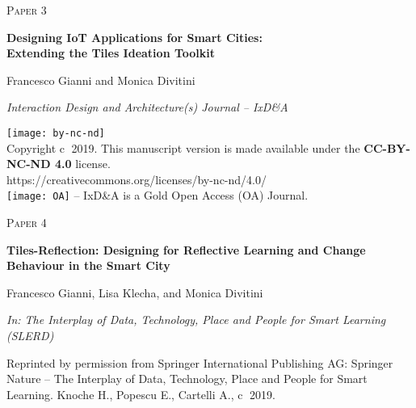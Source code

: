 \cleardoublepage
\begin{flushright}
\textsc{\huge Paper 3}
\end{flushright}
\vspace{3cm}
\begin{center}
	\begin{framed}
		{\Large \textbf{Designing IoT Applications for Smart Cities:\\ Extending the Tiles Ideation Toolkit}}
		
		\medskip
		Francesco Gianni and Monica Divitini
		
		\medskip
		\emph{Interaction Design and Architecture(s) Journal -- IxD\&A}
	\end{framed}
\end{center}

\vspace{9cm}

\texttt{[image: by-nc-nd]}\\
{\scriptsize Copyright \textcircled{c} 2019. This manuscript version is made available under the \textbf{CC-BY-NC-ND 4.0} license.}\\
{\tiny https://creativecommons.org/licenses/by-nc-nd/4.0/}\\
\texttt{[image: OA]} {\scriptsize -- IxD\&A is a Gold Open Access (OA) Journal.}
\cleardoublepage


\cleardoublepage
\begin{flushright}
\textsc{\huge Paper 4}
\end{flushright}
\vspace{3cm}
\begin{center}
	\begin{framed}
		{\Large \textbf{Tiles-Reflection: Designing for Reflective Learning and Change Behaviour in the Smart City}}
		
		\medskip
		Francesco Gianni, Lisa Klecha, and Monica Divitini
		
		\medskip
		\emph{In: The Interplay of Data, Technology, Place and People for Smart Learning (SLERD)}
	\end{framed}	
\end{center}

\vspace{10cm}

{\scriptsize Reprinted by permission from Springer International Publishing AG: Springer Nature -- The Interplay of Data, Technology, Place and People for Smart Learning. Knoche H., Popescu E., Cartelli A., {\tiny \textcircled{c} 2019.}}
\cleardoublepage



